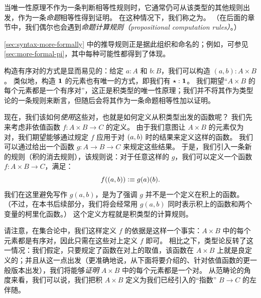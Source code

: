 \begin{rmk}
\begin{enumerate}
    当唯一性原理不作为一条判断相等性规则时，它通常仍可从该类型的其他规则出发，作为一条\emph{命题}相等性得到证明。
    在这种情况下，我们称之为。
    （在后面的章节中，我们偶尔也会遇到\emph{命题计算规则（propositional computation rules）}。）
  \end{enumerate}
\cref{sec:syntax-more-formally} 中的推导规则正是据此组织和命名的；例如，可参见 \cref{sec:more-formal-pi}，其中每种可能性都得到了体现。
\end{rmk}

构造有序对的方式是显而易见的：给定 $a:A$ 和 $b:B$，我们可以构造 $(a,b):A\times B$。
类似地，构造 $\mathbf{1}$ 的元素也有唯一的方式，即我们有 $\star:\mathbf{1}$。
我们期望``$A\times B$ 的每个元素都是一个有序对''，这正是积类型的唯一性原理；我们并不将其作为类型论的一条规则来断言，但随后会将其作为一条命题相等性加以证明。

现在，我们该如何\emph{使用}这些对，也就是如何定义从积类型出发的函数呢？
我们先来考虑非依值函数 $f : A\times B \to C$ 的定义。
由于我们意图让 $A\times B$ 的元素仅为对，我们期望能够通过规定 $f$ 应用于对 $(a,b)$ 时的结果来定义这样的函数。
我们可以通过给出一个函数 $g : A \to B \to C$ 来规定这些结果。
于是，我们引入一条新的规则（积的消去规则），该规则说：对于任意这样的 $g$，我们可以定义一个函数 $f : A\times B \to C$，满足：
\[ f((a,b)) \vcentcolon\equiv g(a)(b). \]
我们在这里避免写作 $g(a,b)$，是为了强调 $g$ 并不是一个定义在积上的函数。
（不过，在本书后续部分，我们将会经常用 $g(a,b)$ 同时表示积上的函数和两个变量的柯里化函数。）
这个定义方程就是积类型的计算规则。

请注意，在集合论中，我们这样定义 $f$ 的依据是这样一个事实：$A\times B$ 中的每个元素都是有序对，因此只需在这些对上定义 $f$ 即可。
相比之下，类型论反转了这一情况：我们假定，只要规定了函数在对上的取值，该函数在 $A\times B$ 上就是良定义的；并且从这一点出发（更准确地说，从下面将要介绍的、针对依值函数的更一般版本出发），我们将能够\emph{证明} $A\times B$ 中的每个元素都是一个对。
从范畴论的角度来看，我们可以说，我们把积 $A\times B$ 定义为我们已经引入的``指数'' $B\to C$ 的左伴随。

